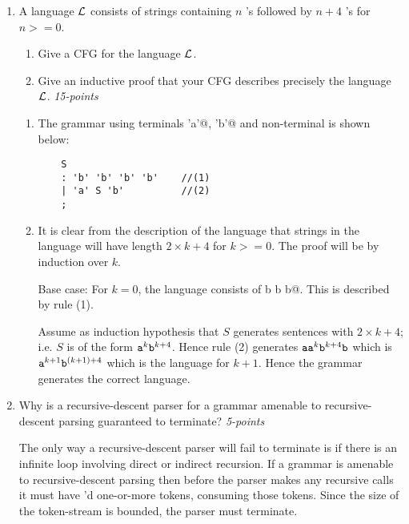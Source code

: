 \documentclass[12pt]{article}
\begin{document}
\begin{enumerate}
\item A language $\cal L$ consists of strings containing $n$
  \verb@a@'s followed by $n + 4$ \verb@b@'s for $n >= 0$.

\begin{enumerate}
\item Give a CFG for the language $\cal L$.

\item Give an inductive proof that your CFG describes precisely the
  language $\cal L$. \hfill\textit{15-points}

\end{enumerate}

\begin{enumerate}

\item The grammar using terminals \verb@'a'@, \verb@'b'@ and
  non-terminal \verb@S@ is shown below:
\begin{verbatim}
    S
    : 'b' 'b' 'b' 'b'    //(1)
    | 'a' S 'b'          //(2)
    ;
\end{verbatim}
    
\item It is
  clear from the description of the language that strings in the
  language will have length $2 \times k + 4$ for $k >= 0$.  The proof
  will be by induction over $k$.

  Base case: For $k = 0$, the language consists of \verb@b b b b@.
  This is described by rule (1).

  Assume as induction hypothesis that $S$ generates sentences with $2
  \times k + 4$; i.e. $S$ is of the form
  $\mbox{\texttt{a}}^k\mbox{\texttt{b}}^{k+4}$. Hence rule (2) generates
  $\mbox{\texttt{a}}\mbox{\texttt{a}}^k\mbox{\texttt{b}}^{k+4}\mbox{\texttt{b}}$
  which is $\mbox{\texttt{a}}^{k+1}\mbox{\texttt{b}}^{(k+1)+4}$ which is the
  language for $k + 1$.  Hence the grammar generates the correct language.

\end{enumerate}
\item Why is a recursive-descent parser for a grammar amenable to
  recursive-descent parsing guaranteed to terminate? \hfill\textit{5-points}

  The only way a recursive-descent parser will fail to terminate is if
  there is an infinite loop involving direct or indirect recursion.
  If a grammar is amenable to recursive-descent parsing then before
  the parser makes any recursive calls it must have \verb@match@'d
  one-or-more tokens, consuming those tokens.  Since the size of the
  token-stream is bounded, the parser must terminate.


\end{enumerate}
\end{document}
